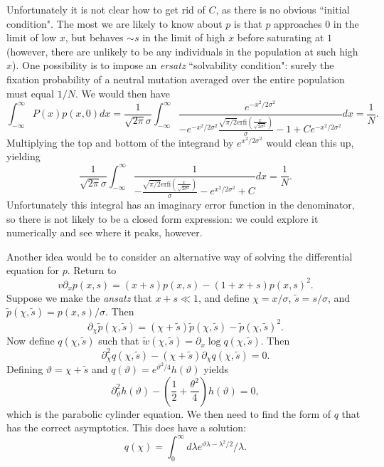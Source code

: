 \documentclass[rmp]{revtex4}
\begin{document}
Unfortunately it is not clear how to get rid of $C$, as there is no obvious ``initial condition".
The most we are likely to know about $p$ is that $p$ approaches $0$ in the limit of low $x$, but behaves $\sim s$ in the limit of high $x$ before saturating at $1$ (however, there are unlikely to be any individuals in the population at such high $x$).
One possibility is to impose an \emph{ersatz} ``solvability condition": surely the fixation probability of a neutral mutation averaged over the entire population must equal $1/N$. We would then have
\begin{equation}
\int_{-\infty}^{\infty} P(x)p(x,0)dx = \frac{1}{\sqrt{2\pi}\sigma}\int_{-\infty}^{\infty} \frac{e^{-x^2/2\sigma^2}}{-e^{-x^2/2\sigma^2} \frac{\sqrt{\pi /2} \textrm{erfi}(\frac{x}{\sqrt{2\sigma^2}})}{\sigma} - 1 + Ce^{-x^2/2\sigma^2}}dx = \frac{1}{N}.
\end{equation}
Multiplying the top and bottom of the integrand by $e^{x^2/2\sigma^2}$ would clean this up, yielding
\begin{equation}
\frac{1}{\sqrt{2\pi}\sigma}\int_{-\infty}^{\infty} \frac{1}{-\frac{\sqrt{\pi /2} \textrm{erfi}(\frac{x}{\sqrt{2\sigma^2}})}{\sigma} - e^{x^2/2\sigma^2} + C}dx = \frac{1}{N}.
\end{equation}
Unfortunately this integral has an imaginary error function in the denominator, so there is not likely to be a closed form expression: we could explore it numerically and see where it peaks, however.

Another idea would be to consider an alternative way of solving the differential equation for $p$.
Return to
\begin{equation}
v \partial_x p(x,s) = (x+s)p(x,s) - (1+x+s)p(x,s)^2.
\end{equation}
Suppose we make the \emph{ansatz} that $x+s \ll 1$, and define $\chi = x/\sigma$, $\tilde{s} = s/\sigma$, and $\tilde{p}(\chi,\tilde{s}) = p(x,s)/\sigma$. Then
\begin{equation}
\partial_\chi \tilde{p}(\chi,\tilde{s}) = (\chi + \tilde{s})\tilde{p}(\chi,\tilde{s}) - \tilde{p}(\chi,\tilde{s})^2.
\end{equation}
Now define $q(\chi,\tilde{s})$ such that $\tilde{w}(\chi,\tilde{s}) = \partial_x \log q(\chi,\tilde{s})$.
Then
\begin{equation}
\partial_\chi^2 q(\chi,\tilde{s}) - (\chi+\tilde{s})\partial_\chi q(\chi, \tilde{s}) = 0.
\end{equation}
Defining $\vartheta = \chi + \tilde{s}$ and $q(\vartheta) = e^{\vartheta^2/4}h(\vartheta)$ yields
\begin{equation}
\partial_\vartheta^2 h(\vartheta) - (\frac{1}{2} + \frac{\theta^2}{4})h(\vartheta) = 0,
\end{equation}
which is the parabolic cylinder equation.
We then need to find the form of $q$ that has the correct asymptotics.
This does have a solution:
\begin{equation}
q(\chi) = \int_0^\infty d\lambda e^{\vartheta \lambda - \lambda^2/2}/\lambda.
\end{equation}
\end{document}
